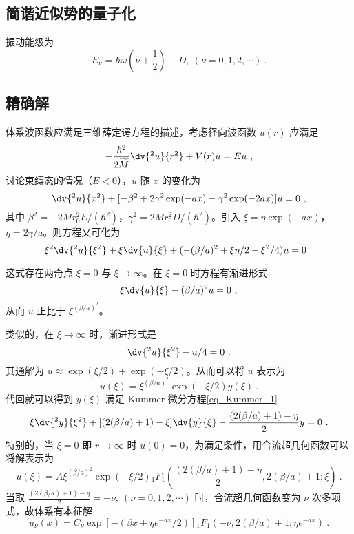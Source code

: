 \subsection{简谐近似势的量子化}
振动能级为
$$E_\nu = \hbar \omega (\nu + \frac12) - D , \ (\nu = 0, 1, 2, \cdots) ~.$$

\subsection{精确解}
体系波函数应满足三维薛定谔方程的描述，考虑径向波函数 $u(r)$ 应满足
\begin{equation}
-\frac{\hbar^2}{2 \widetilde M} \dv{^2 u}{r^2} + V(r) u = Eu ~,
\end{equation}
讨论束缚态的情况（$E<0$），$u$ 随 $x$ 的变化为
\begin{equation}
\dv{^2 u}{x^2} + [-\beta^2 + 2 \gamma^2 \exp(-ax) - \gamma^2 \exp(-2ax)]u = 0 ~,
\end{equation}
其中 $\beta^2 = -2\widetilde M r_0^2 E/(\hbar^2)$，$\gamma^2 = 2\widetilde M r_0^2 D/(\hbar^2)$。引入 $\xi = \eta \exp(-ax)$，$\eta = 2 \gamma/a$。则方程又可化为
\begin{equation}
\xi^2 \dv{^2 u}{\xi^2} + \xi \dv{u}{\xi} + (-(\beta/a)^2 + \xi\eta/2 - \xi^2/4)u = 0 ~~
\end{equation}

这式存在两奇点 $\xi = 0$ 与 $\xi \rightarrow \infty$。在 $\xi = 0$ 时方程有渐进形式
\begin{equation}
\xi \dv{u}{\xi} - (\beta/a)^2 u = 0 ~,
\end{equation}
从而 $u$ 正比于 $\xi^{(\beta/a)^2}$。

类似的，在 $\xi \rightarrow \infty$ 时，渐进形式是
\begin{equation}
\dv{^2 u}{\xi^2} - u/4 = 0 ~.
\end{equation}
其通解为 $u \approx \exp(\xi/2) + \exp(-\xi/2)$。从而可以将 $u$ 表示为
\begin{equation}
u(\xi) = \xi^{(\beta/a)^2} \exp(-\xi/2) y(\xi) ~.
\end{equation}
代回就可以得到 $y(\xi)$ 满足 Kummer 微分方程\autoref{eq_Kummer_1}~
\begin{equation}
\xi \dv{^2 y}{\xi^2} + [(2(\beta/a) + 1) - \xi] \dv{y}{\xi} - \frac{(2(\beta/a) + 1)-\eta}{2}y=0 ~.
\end{equation}
特别的，当 $\xi = 0$ 即 $r \rightarrow \infty$ 时 $u(0) = 0$，为满足条件，用合流超几何函数可以将解表示为
\begin{equation}
u(\xi) = A \xi^{(\beta/a)^2} \exp(-\xi/2) {}_1F_1\left(\frac{(2 (\beta/a) + 1) - \eta}{2}, 2(\beta/a)+1;\xi\right)~.
\end{equation}
当取 $\frac{(2 (\beta/a) + 1) - \eta}{2} = -\nu, \ (\nu = 0, 1, 2, \cdots)$ 时，合流超几何函数变为 $\nu$ 次多项式，故体系有本征解
\begin{equation}
u_\nu(x) = C_\nu \exp\left[- (\beta x + \eta e^{-ax}/2)\right] {}_1F_1 \left(-\nu, 2(\beta/a)+1; \eta e^{-ax}\right)~.
\end{equation}
